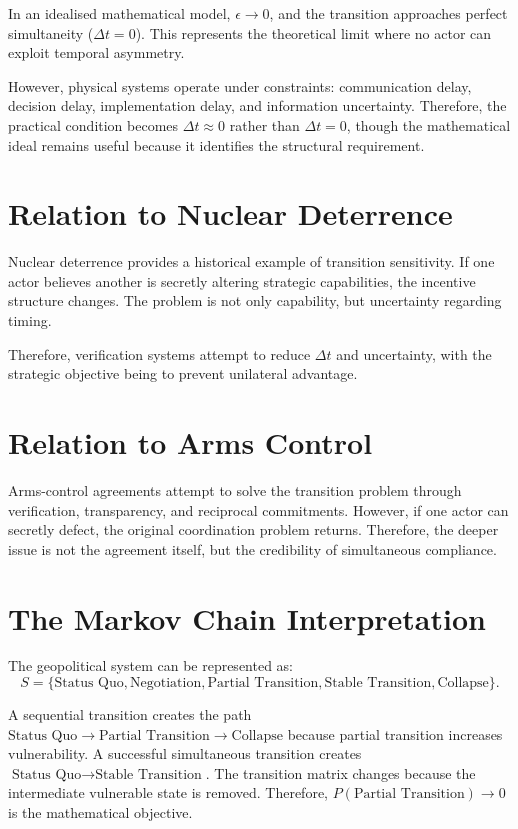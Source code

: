 \documentclass[11pt,openany]{book}
\theoremstyle{plain}
\theoremstyle{definition}
\begin{document}
In an idealised mathematical model, \(\epsilon \to 0\), and the transition approaches perfect simultaneity (\(\Delta t = 0\)). This represents the theoretical limit where no actor can exploit temporal asymmetry. 

However, physical systems operate under constraints: communication delay, decision delay, implementation delay, and information uncertainty. Therefore, the practical condition becomes \(\Delta t \approx 0\) rather than \(\Delta t = 0\), though the mathematical ideal remains useful because it identifies the structural requirement.

\section*{Relation to Nuclear Deterrence}

Nuclear deterrence provides a historical example of transition sensitivity. If one actor believes another is secretly altering strategic capabilities, the incentive structure changes. The problem is not only capability, but uncertainty regarding timing. 

Therefore, verification systems attempt to reduce \(\Delta t\) and uncertainty, with the strategic objective being to prevent unilateral advantage.

\section*{Relation to Arms Control}

Arms-control agreements attempt to solve the transition problem through verification, transparency, and reciprocal commitments. However, if one actor can secretly defect, the original coordination problem returns. Therefore, the deeper issue is not the agreement itself, but the credibility of simultaneous compliance.

\section*{The Markov Chain Interpretation}

The geopolitical system can be represented as:
\[
S = \{\text{Status Quo}, \text{Negotiation}, \text{Partial Transition}, \text{Stable Transition}, \text{Collapse}\}.
\]

A sequential transition creates the path \(\text{Status Quo} \to \text{Partial Transition} \to \text{Collapse}\) because partial transition increases vulnerability. A successful simultaneous transition creates \(\text{Status Quo} \to \text{Stable Transition}\). The transition matrix changes because the intermediate vulnerable state is removed. Therefore, \(P(\text{Partial Transition}) \to 0\) is the mathematical objective.
\end{document}
